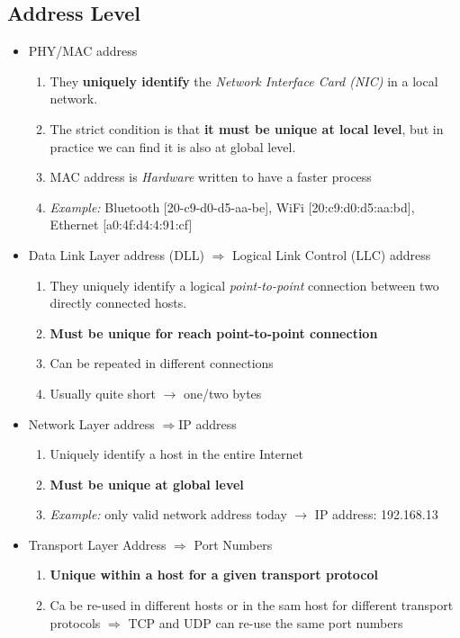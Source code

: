 \subsection{Address Level}
\begin{itemize}
\item PHY/MAC address
	\begin{enumerate}
	\item They \textbf{uniquely identify} the 				\textit{Network Interface Card (NIC)} in a local 		network.\\
	\item The strict condition is that \textbf{it must be 		unique at local level}, but in practice we can find 		it is also at global level.
    \item MAC address is \emph{Hardware} written to have a faster process
	\item \emph{Example: } Bluetooth [20-c9-d0-d5-aa-be], 		WiFi [20:c9:d0:d5:aa:bd], Ethernet [a0:4f:d4:4:91:cf]
\end{enumerate}
\item Data Link Layer address (DLL) $\Rightarrow$ Logical Link Control (LLC) address
	\begin{enumerate}
	\item They uniquely identify a logical \textit{point-to-point} connection between two directly connected hosts.
    \item \textbf{Must be unique for reach point-to-point connection}
    \item Can be repeated in different connections
    \item Usually quite short $\rightarrow$ one/two bytes
	\end{enumerate}
\item Network Layer address $\Rightarrow$IP address
	\begin{enumerate}
	\item Uniquely identify a host in the entire Internet
    \item \textbf{Must be unique at global level}
    \item \emph{Example: } only valid network address today $\rightarrow$ IP address: 192.168.13
	\end{enumerate}
\item Transport Layer Address $\Rightarrow$ Port Numbers
	\begin{enumerate}
	\item \textbf{Unique within a host for a given transport protocol}
    \item Ca be re-used in different hosts or in the sam host for different transport protocols $\Rightarrow$ TCP and UDP can re-use the same port numbers

\end{enumerate}
\end{itemize}
